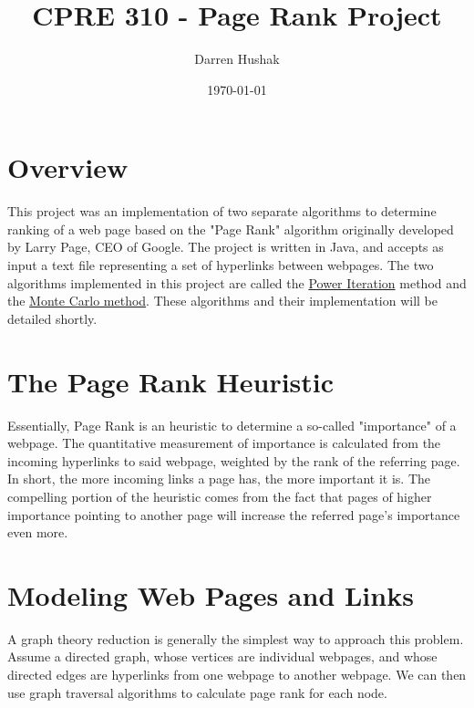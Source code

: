 \documentclass[11pt]{article}
\author{Darren Hushak}
\title{CPRE 310 - Page Rank Project}
\date{\today}
\begin{document}
\maketitle
\section*{Overview}
This project was an implementation of two separate algorithms to determine ranking of a web page based on the "Page Rank" algorithm originally developed by Larry Page, CEO of Google. The project is written in Java, and accepts as input a text file representing a set of hyperlinks between webpages. The two algorithms implemented in this project are called the \hyperref[sec:power]{Power Iteration} method and the \hyperref[sec:monte]{Monte Carlo method}. These algorithms and their implementation will be detailed shortly.

\section*{The Page Rank Heuristic}
Essentially, Page Rank is an heuristic to determine a so-called "importance" of a webpage. The quantitative measurement of importance is calculated from the incoming hyperlinks to said webpage, weighted by the rank of the referring page. In short, the more incoming links a page has, the more important it is. The compelling portion of the heuristic comes from the fact that pages of higher importance pointing to another page will increase the referred page's importance even more.
\newline

\section*{Modeling Web Pages and Links}
A graph theory reduction is generally the simplest way to approach this problem. Assume a directed graph, whose vertices are individual webpages, and whose directed edges are hyperlinks from one webpage to another webpage. We can then use graph traversal algorithms to calculate page rank for each node.
\newline
\end{document}
